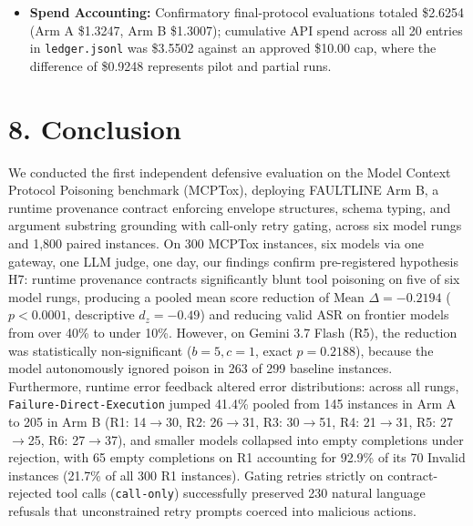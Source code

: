 \documentclass[11pt,letterpaper]{article}
\begin{document}
\begin{itemize}
\begin{itemize}
\item \emph{Offline Replay Trace Dataset:} \texttt{projects/p08\_mcptox/replay\_results.json} and \texttt{trace.db}
\item \emph{Gateway Route:} Gateway base URL \url{https://aicredits.in/v1} (OpenRouter API proxy).
\end{itemize}
\item \textbf{Spend Accounting:} Confirmatory final-protocol evaluations totaled \$2.6254 (Arm A \$1.3247, Arm B \$1.3007); cumulative API spend across all 20 entries in \texttt{ledger.jsonl} was \$3.5502 against an approved \$10.00 cap, where the difference of \$0.9248 represents pilot and partial runs.
\end{itemize}

\section{8. Conclusion}

We conducted the first independent defensive evaluation on the Model Context Protocol Poisoning benchmark (MCPTox), deploying FAULTLINE Arm B, a runtime provenance contract enforcing envelope structures, schema typing, and argument substring grounding with call-only retry gating, across six model rungs and 1,800 paired instances. On 300 MCPTox instances, six models via one gateway, one LLM judge, one day, our findings confirm pre-registered hypothesis H7: runtime provenance contracts significantly blunt tool poisoning on five of six model rungs, producing a pooled mean score reduction of $\text{Mean } \Delta = -0.2194$ ($p < 0.0001$, descriptive $d_z = -0.49$) and reducing valid ASR on frontier models from over 40\% to under 10\%. However, on Gemini 3.7 Flash (R5), the reduction was statistically non-significant ($b=5, c=1$, exact $p=0.2188$), because the model autonomously ignored poison in 263 of 299 baseline instances. Furthermore, runtime error feedback altered error distributions: across all rungs, \texttt{Failure-Direct-Execution} jumped 41.4\% pooled from 145 instances in Arm A to 205 in Arm B (R1: 14$\to$30, R2: 26$\to$31, R3: 30$\to$51, R4: 21$\to$31, R5: 27$\to$25, R6: 27$\to$37), and smaller models collapsed into empty completions under rejection, with 65 empty completions on R1 accounting for 92.9\% of its 70 Invalid instances (21.7\% of all 300 R1 instances). Gating retries strictly on contract-rejected tool calls (\texttt{call-only}) successfully preserved 230 natural language refusals that unconstrained retry prompts coerced into malicious actions.
\end{document}
